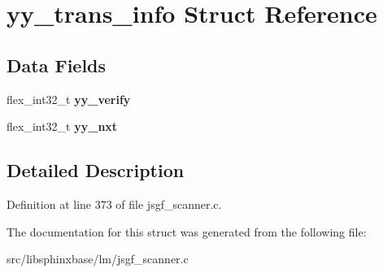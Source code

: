 \section{yy\-\_\-trans\-\_\-info Struct Reference}
\label{structyy__trans__info}
\subsection*{Data Fields}
\begin{DoxyCompactItemize}
\item 
flex\-\_\-int32\-\_\-t {\bfseries yy\-\_\-verify}\label{structyy__trans__info_a5c9f61e770deef50bd4e697310342fe9}

\item 
flex\-\_\-int32\-\_\-t {\bfseries yy\-\_\-nxt}\label{structyy__trans__info_ae0715250c2bef261e596e77e0030f13e}

\end{DoxyCompactItemize}


\subsection{Detailed Description}


Definition at line 373 of file jsgf\-\_\-scanner.\-c.



The documentation for this struct was generated from the following file\-:\begin{DoxyCompactItemize}
\item 
src/libsphinxbase/lm/jsgf\-\_\-scanner.\-c\end{DoxyCompactItemize}
